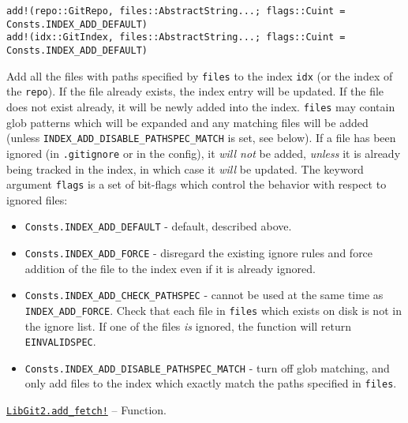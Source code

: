 \begin{adjustwidth}{2em}{0pt}


\begin{verbatim}
add!(repo::GitRepo, files::AbstractString...; flags::Cuint = Consts.INDEX_ADD_DEFAULT)
add!(idx::GitIndex, files::AbstractString...; flags::Cuint = Consts.INDEX_ADD_DEFAULT)
\end{verbatim}

Add all the files with paths specified by \texttt{files} to the index \texttt{idx} (or the index of the \texttt{repo}). If the file already exists, the index entry will be updated. If the file does not exist already, it will be newly added into the index. \texttt{files} may contain glob patterns which will be expanded and any matching files will be added (unless \texttt{INDEX\_ADD\_DISABLE\_PATHSPEC\_MATCH} is set, see below). If a file has been ignored (in \texttt{.gitignore} or in the config), it \emph{will not} be added, \emph{unless} it is already being tracked in the index, in which case it \emph{will} be updated. The keyword argument \texttt{flags} is a set of bit-flags which control the behavior with respect to ignored files:

\begin{itemize}
\item \texttt{Consts.INDEX\_ADD\_DEFAULT} - default, described above.


\item \texttt{Consts.INDEX\_ADD\_FORCE} - disregard the existing ignore rules and force addition of the file to the index even if it is already ignored.


\item \texttt{Consts.INDEX\_ADD\_CHECK\_PATHSPEC} - cannot be used at the same time as \texttt{INDEX\_ADD\_FORCE}. Check that each file in \texttt{files} which exists on disk is not in the ignore list. If one of the files \emph{is} ignored, the function will return \texttt{EINVALIDSPEC}.


\item \texttt{Consts.INDEX\_ADD\_DISABLE\_PATHSPEC\_MATCH} - turn off glob matching, and only add files to the index which exactly match the paths specified in \texttt{files}.

\end{itemize}


\end{adjustwidth}
\hypertarget{6981412809211295791}{} 
\hyperlink{6981412809211295791}{\texttt{LibGit2.add\_fetch!}}  -- {Function.}

